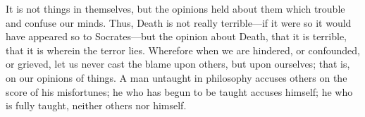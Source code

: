 It is not things in themselves, but  the opinions held about them which trouble
and confuse our  minds. Thus, Death is  not really terrible---if it  were so it
would have  appeared so to Socrates---but  the opinion about Death,  that it is
terrible, that it  is wherein the terror lies. Wherefore  when we are hindered,
or confounded, or  grieved, let us never  cast the blame upon  others, but upon
ourselves; that  is, on our  opinions of things.  A man untaught  in philosophy
accuses others on the  score of his misfortunes; he who has  begun to be taught
accuses himself; he who is fully taught, neither others nor himself.
